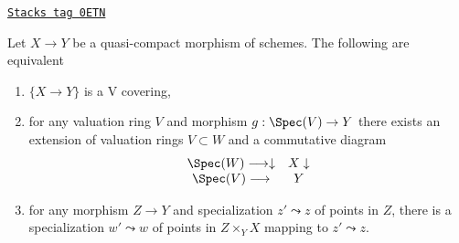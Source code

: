 \begin{lemma}
\label{topologies-lemma-refine-qcqs-V}
\href{https://stacks.math.columbia.edu/tag/0ETN}{\texttt{Stacks tag 0ETN}}

Let $X \to Y$ be a quasi-compact morphism of schemes.
The following are equivalent
\begin{enumerate}
\item $\{X \to Y\}$ is a V covering,
\item for any valuation ring $V$ and morphism $g : \Spec(V) \to Y$
there exists an extension of valuation rings $V \subset W$
and a commutative diagram
$$
\begin{array}{cc}\Spec(W) \longrightarrow\downarrow & X \downarrow \\ \Spec(V) \longrightarrow & Y\end{array}
$$
\item for any morphism $Z \to Y$ and specialization $z' \leadsto z$
of points in $Z$, there is a specialization $w' \leadsto w$
of points in $Z \times_Y X$ mapping to $z' \leadsto z$.
\end{enumerate}
\end{lemma}

